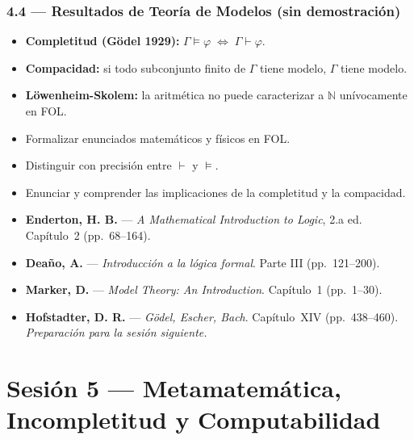 \documentclass[11pt, letterpaper]{article}
\begin{document}
\subsubsection{4.4 --- Resultados de Teor\'ia de Modelos (sin demostraci\'on)}
\begin{itemize}
  \item \textbf{Completitud (G\"odel 1929):} $\Gamma\models\varphi\;\Leftrightarrow\;\Gamma\vdash\varphi$.
  \item \textbf{Compacidad:} si todo subconjunto finito de $\Gamma$ tiene modelo, $\Gamma$ tiene modelo.
  \item \textbf{L\"owenheim-Skolem:} la aritm\'etica no puede caracterizar a $\mathbb{N}$ un\'ivocamente en FOL.
\end{itemize}

\begin{objetivos}
\begin{itemize}
  \item Formalizar enunciados matem\'aticos y f\'isicos en FOL.
  \item Distinguir con precisi\'on entre $\vdash$ y $\models$.
  \item Enunciar y comprender las implicaciones de la completitud y la compacidad.
\end{itemize}
\end{objetivos}

\begin{lecturas}
\begin{itemize}
  \item[$(\star)$] \textbf{Enderton, H. B.} --- \emph{A Mathematical Introduction to Logic}, 2.a ed. Cap\'itulo~2 (pp.\ 68--164).
  \item[$(\star)$] \textbf{Deaño, A.} --- \emph{Introducci\'on a la l\'ogica formal}. Parte III (pp.\ 121--200).
  \item \textbf{Marker, D.} --- \emph{Model Theory: An Introduction}. Cap\'itulo~1 (pp.\ 1--30).
  \item \textbf{Hofstadter, D. R.} --- \emph{G\"odel, Escher, Bach}. Cap\'itulo~XIV (pp.\ 438--460). \textit{Preparaci\'on para la sesi\'on siguiente.}
\end{itemize}
\end{lecturas}

\newpage

\section{Sesi\'on 5 --- Metamatem\'atica, Incompletitud y Computabilidad}
\end{document}
